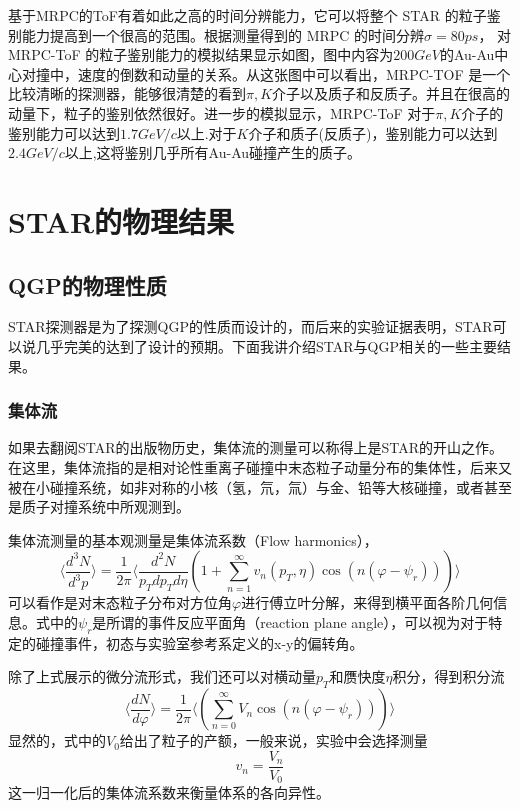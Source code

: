 \documentclass[%
 reprint,
 amsmath,amssymb,
 aps,
]{revtex4-1}
\begin{document}
基于MRPC的ToF有着如此之高的时间分辨能力，它可以将整个 STAR 的粒子鉴别能力提高到一个很高的范围。根据测量得到的 MRPC 的时间分辨$\sigma=80\si{ps}$， 对 MRPC-ToF 的粒子鉴别能力的模拟结果显示如图，图中内容为$200\si{GeV}$的Au-Au中心对撞中，速度的倒数和动量的关系。从这张图中可以看出，MRPC-TOF 是一个比较清晰的探测器，能够很清楚的看到$\pi,K$介子以及质子和反质子。并且在很高的动量下，粒子的鉴别依然很好。进一步的模拟显示，MRPC-ToF 对于$\pi,K$介子的鉴别能力可以达到$1.7\si{GeV/c}$以上.对于$K$介子和质子(反质子)，鉴别能力可以达到$2.4\si{GeV/c}$以上,这将鉴别几乎所有Au-Au碰撞产生的质子。

\section{\label{sec:PhyRes}STAR的物理结果}
\subsection{\label{sec:qgp}QGP的物理性质}
STAR探测器是为了探测QGP的性质而设计的，而后来的实验证据表明，STAR可以说几乎完美的达到了设计的预期。下面我讲介绍STAR与QGP相关的一些主要结果。
\subsubsection{\label{sec:Flow}集体流}
如果去翻阅STAR的出版物历史，集体流的测量可以称得上是STAR的开山之作。在这里，集体流指的是相对论性重离子碰撞中末态粒子动量分布的集体性，后来又被在小碰撞系统，如非对称的小核（氢，氘，氚）与金、铅等大核碰撞，或者甚至是质子对撞系统中所观测到。

集体流测量的基本观测量是集体流系数（Flow harmonics），
\begin{equation}
    \langle \frac{d^3N}{d^3 p} \rangle = \frac{1}{2\pi} \langle \frac{d^2N}{p_Tdp_Td\eta} (1+\sum_{n=1}^\infty v_n(p_T,\eta)\cos(n(\varphi-\psi_r))) \rangle 
\end{equation}
可以看作是对末态粒子分布对方位角$\varphi$进行傅立叶分解，来得到横平面各阶几何信息。式中的$\psi_r$是所谓的事件反应平面角（reaction plane angle），可以视为对于特定的碰撞事件，初态与实验室参考系定义的x-y的偏转角。

除了上式展示的微分流形式，我们还可以对横动量$p_T$和赝快度$\eta$积分，得到积分流
\begin{equation}
    \langle \frac{dN}{d\varphi} \rangle = \frac{1}{2\pi} \langle (\sum_{n=0}^\infty V_n\cos(n(\varphi-\psi_r))) \rangle 
\end{equation}
显然的，式中的$V_0$给出了粒子的产额，一般来说，实验中会选择测量
\begin{equation}
    v_n = \frac{V_n}{V_0}
\end{equation}
这一归一化后的集体流系数来衡量体系的各向异性。
\end{document}
